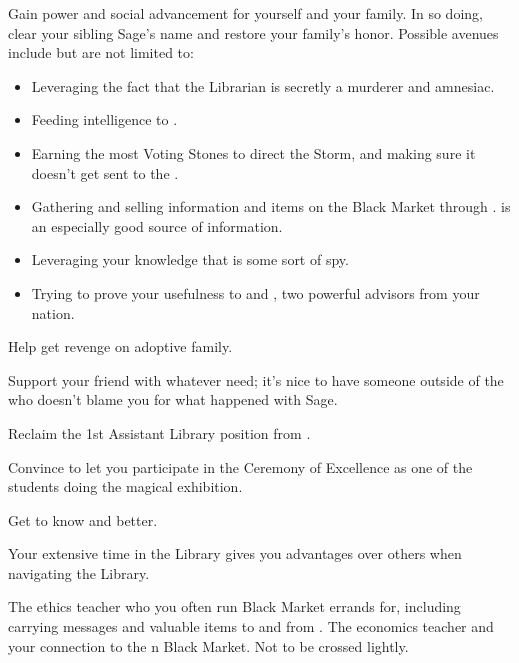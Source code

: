 \documentclass[char]{GL2020}
\begin{document}
\begin{itemz}
    \item Gain power and social advancement for yourself and your family. In so doing, clear your sibling Sage’s name and restore your family’s honor. Possible avenues include but are not limited to:
    \begin{itemize}
        \item Leveraging the fact that the Librarian is secretly a murderer and amnesiac.
        \item Feeding intelligence to \cHistory{}.
        \item Earning the most Voting Stones to direct the Storm, and making sure it doesn't get sent to the \pFarm{}.
        \item Gathering and selling information and items on the Black Market through \cChupSecond{}. \cEthics{} is an especially good source of information.
        \item Leveraging your knowledge that \cInterpol{} is some sort of spy.
        \item Trying to prove your usefulness to \cEvil{} and \cHedonist{}, two powerful advisors from your nation.
    \end{itemize}
    \item Help \cAdopted{} get revenge on \cAdopted{\their} adoptive family.
    \item Support your friend \cPresident{} with whatever \cPresident{\they} need\cPresident{\verbs}; it’s nice to have someone outside of the \pFarm{} who doesn’t blame you for what happened with Sage.
   \end{itemz}

\begin{itemz}
     \item Reclaim the 1st Assistant Library position from \cAmbition{}.
     \item Convince \cMusic{} to let you participate in the Ceremony of Excellence as one of the students doing the magical exhibition.
     \item Get to know \cChupStudent{} and \cDisney{} better.
\end{itemz}

\begin{itemz}[Notes]
    \item Your extensive time in the Library gives you advantages over others when navigating the Library.
\end{itemz}

\begin{contacts}
    \contact{\cEthics{}} The ethics teacher who you often run Black Market errands for, including carrying messages and valuable items to and from \cChupSecond{}.
    \contact{\cChupSecond{}} The economics teacher and your connection to the \pEarth{}n Black Market. Not to be crossed lightly. 
\end{contacts}
\end{document}
